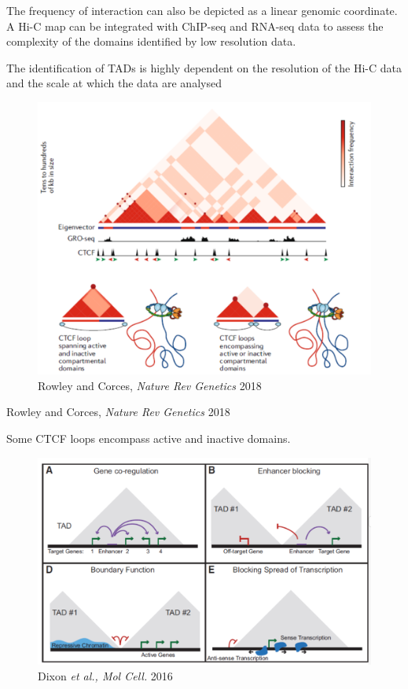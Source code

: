 The frequency of interaction can also be depicted as a linear genomic coordinate. A Hi-C map can be integrated with ChIP-seq and RNA-seq data to assess the complexity of the domains identified by low resolution data.

The identification of TADs is highly dependent on the resolution of the Hi-C data and the scale at which the data are analysed

\begin{figure}
\centering
\includegraphics[width=\textwidth]{../_resources/Screenshot_2022-10-19_at_09-20-57.png}
\caption{Rowley and Corces, \emph{Nature Rev Genetics} 2018}
\end{figure}

Rowley and Corces, \emph{Nature Rev Genetics} 2018

Some CTCF loops encompass active and inactive domains.

\begin{figure}
\centering
\includegraphics[width=\textwidth]{../_resources/Screenshot_2022-10-19_at_09-21-57.png}
\caption{Dixon \emph{et al., Mol Cell.} 2016}
\end{figure}

